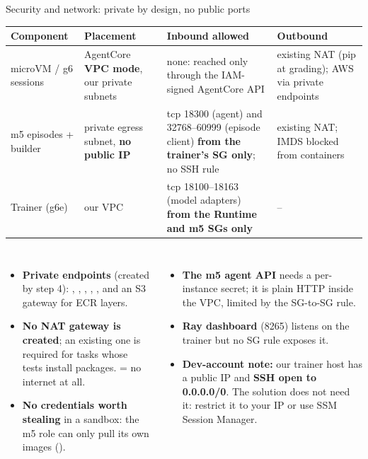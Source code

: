 \begin{frame}{Security and network: private by design, no public ports}
\scriptsize\setlength{\tabcolsep}{3pt}
\begin{tabularx}{\textwidth}{@{}P{0.16\textwidth}P{0.27\textwidth}YP{0.20\textwidth}@{}}
\toprule
\textbf{Component} & \textbf{Placement} & \textbf{Inbound allowed} & \textbf{Outbound}\\
\midrule
\textcolor{cat2}{microVM} / \textcolor{cat3}{g6} sessions & AgentCore \textbf{VPC mode}, our private  subnets & none: reached only through the IAM-signed AgentCore API & existing NAT (pip at grading); AWS via private endpoints\\
\textcolor{cat1}{m5} episodes + builder & private egress subnet, \textbf{no public IP} & tcp 18300 (agent) and 32768--60999 (episode client) \textbf{from the trainer's SG only}; no SSH rule & existing NAT; IMDS blocked from containers\\
Trainer (g6e) & our VPC & tcp 18100--18163 (model adapters) \textbf{from the Runtime and m5 SGs only} & --\\
\bottomrule
\end{tabularx}
\par\vspace{2mm}
\begin{columns}[T]
\begin{itemize}\scriptsize\setlength{\itemsep}{0.7mm}
\item \textbf{Private endpoints} (created by step 4): , , , , , and an S3 gateway for ECR layers.
\item \textbf{No NAT gateway is created}; an existing one is required for tasks whose tests install packages.  = no internet at all.
\item \textbf{No credentials worth stealing} in a sandbox: the m5 role can only pull its own images ().
\end{itemize}
\begin{itemize}\scriptsize\setlength{\itemsep}{0.7mm}
\item \textbf{The m5 agent API} needs a per-instance secret; it is plain HTTP inside the VPC, limited by the SG-to-SG rule.
\item \textbf{Ray dashboard} (8265) listens on the trainer but no SG rule exposes it.
\item \textbf{Dev-account note:} our trainer host has a public IP and \textbf{SSH open to 0.0.0.0/0}. The solution does not need it: restrict it to your IP or use SSM Session Manager.
\end{itemize}
\end{columns}
\end{frame}

